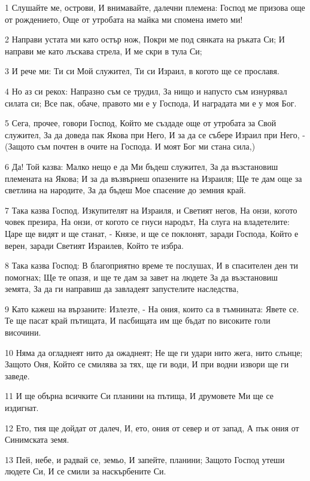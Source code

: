 \par 1 Слушайте ме, острови, И внимавайте, далечни племена: Господ ме призова още от рождението, Още от утробата на майка ми спомена името ми!
\par 2 Направи устата ми като остър нож, Покри ме под сянката на ръката Си; И направи ме като лъскава стрела, И ме скри в тула Си;
\par 3 И рече ми: Ти си Мой служител, Ти си Израил, в когото ще се прославя.
\par 4 Но аз си рекох: Напразно съм се трудил, За нищо и напусто съм изнурявал силата си; Все пак, обаче, правото ми е у Господа, И наградата ми е у моя Бог.
\par 5 Сега, прочее, говори Господ, Който ме създаде още от утробата за Свой служител, За да доведа пак Якова при Него, И за да се събере Израил при Него, - (Защото съм почтен в очите на Господа. И моят Бог ми стана сила,)
\par 6 Да! Той казва: Малко нещо е да Ми бъдеш служител, За да възстановиш племената на Якова; И за да възвърнеш опазените на Израиля; Ще те дам още за светлина на народите, За да бъдеш Мое спасение до земния край.
\par 7 Така казва Господ. Изкупителят на Израиля, и Светият негов, На онзи, когото човек презира, На онзи, от когото се гнуси народът, На слуга на владетелите: Царе ще видят и ще станат, - Князе, и ще се поклонят, заради Господа, Който е верен, заради Светият Израилев, Който те избра.
\par 8 Така казва Господ: В благоприятно време те послушах, И в спасителен ден ти помогнах; Ще те опазя, и ще те дам за завет на людете За да възстановиш земята, За да ги направиш да завладеят запустелите наследства,
\par 9 Като кажеш на вързаните: Излезте, - На ония, които са в тъмнината: Явете се. Те ще пасат край пътищата, И пасбищата им ще бъдат по високите голи височини.
\par 10 Няма да огладнеят нито да ожаднеят; Не ще ги удари нито жега, нито слънце; Защото Оня, Който се смилява за тях, ще ги води, И при водни извори ще ги заведе.
\par 11 И ще обърна всичките Си планини на пътища, И друмовете Ми ще се издигнат.
\par 12 Ето, тия ще дойдат от далеч, И, ето, ония от север и от запад, А пък ония от Синимската земя.
\par 13 Пей, небе, и радвай се, земьо, И запейте, планини; Защото Господ утеши людете Си, И се смили за наскърбените Си.

